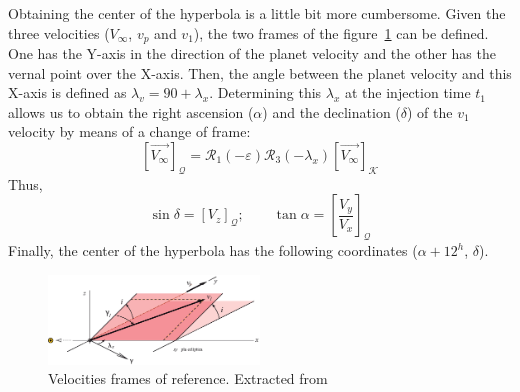 Obtaining the center of the hyperbola is a little bit more cumbersome. Given the three velocities ($V_\infty$, $v_p$ and $v_1$), the two frames of the figure~\ref{fig:frames} can be defined. One has the Y-axis in the direction of the planet velocity and the other has the vernal point over the X-axis. Then, the angle between the planet velocity and this X-axis is defined as $\lambda_v=90+\lambda_x$. Determining this $\lambda_x$ at the injection time $t_1$ 
allows us to obtain the right ascension ($\alpha$) and the declination ($\delta$) of the $v_1$ velocity by means of a change of frame:
\begin{equation}
	\left[\vec{V_\infty}\right]_\mathcal{Q}=\mathcal{R}_1(-\varepsilon)\mathcal{R}_3(-\lambda_x)	\left[\vec{V_\infty}\right]_\mathcal{K}
\end{equation}
Thus,
\begin{equation}
	\sin \delta =\left[V_z\right]_\mathcal{Q}; \qquad \tan \alpha=\left[\frac{V_y}{V_x}\right]_\mathcal{Q}
\end{equation}
Finally, the center of the hyperbola has the following coordinates ($\alpha+12^h$, $\delta$).
\begin{figure}[H]
	\centering
	\includegraphics[width=0.5\textwidth]{././images/1stStage2} 
	\caption{Velocities frames of reference. Extracted from~\cite{PCA}}
	\label{fig:frames}
\end{figure}
